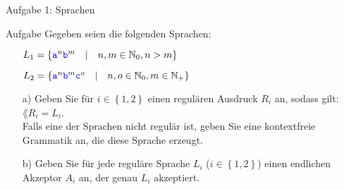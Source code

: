 
\begin{frame}{Aufgabe 1: Sprachen}
	\begin{block}{Aufgabe}
		Gegeben seien die folgenden Sprachen:
		\begin{itemize}
			\item[] $L_1 = \left\{\hbox{\textcolor{blue}{\texttt{a}}}^n\hbox{\textcolor{blue}{\texttt{b}}}^m \quad \middle| \quad n,m\in\mathbb{N}_0, n>m\right\}$
			\item[] $L_2 = \left\{\hbox{\textcolor{blue}{\texttt{a}}}^n \hbox{\textcolor{blue}{\texttt{b}}}^m \hbox{\textcolor{blue}{\texttt{c}}}^o \quad \middle| \quad n,o\in\mathbb{N}_0, m\in\mathbb{N}_+\right\}$
		\end{itemize}
		\begin{itemize}
			\item[a)] Geben Sie für $i\in\left\{1,2\right\}$ einen regulären Ausdruck $R_i$ an, sodass gilt: $\lang{R_i}=L_i$. \\
				Falls eine der Sprachen nicht regulär ist, geben Sie eine kontextfreie Grammatik an, die diese Sprache erzeugt.
			\item[b)] Geben Sie für jede reguläre Sprache $L_i$ ($i\in\left\{1,2\right\}$) einen endlichen Akzeptor $A_i$ an, der genau $L_i$ akzeptiert.
		\end{itemize}
	\end{block}
\end{frame}

